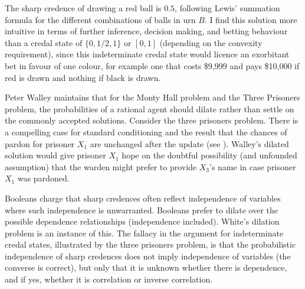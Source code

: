 \documentclass[11pt]{article}
\begin{document}
The sharp credence of drawing a red ball is $0.5$, following Lewis'
summation formula for the different combinations of balls in urn $B$.
I find this solution more intuitive in terms of further inference,
decision making, and betting behaviour than a credal state of
$\{0,1/2,1\}$ or $[0,1]$ (depending on the convexity requirement),
since this indeterminate credal state would licence an exorbitant bet
in favour of one colour, for example one that costs \$9,999 and pays
\$10,000 if red is drawn and nothing if black is drawn.


Peter Walley maintains that for the Monty Hall problem and the Three
Prisoners problem, the probabilities of a rational agent should dilate
rather than settle on the commonly accepted solutions. Consider the
three prisoners problem. There is a compelling case for standard
conditioning and the result that the chances of pardon for prisoner
$X_{1}$ are unchanged after the update (see
). Walley's dilated solution would give
prisoner $X_{1}$ hope on the doubtful possibility (and unfounded
assumption) that the warden might prefer to provide $X_{3}$'s name in
case prisoner $X_{1}$ was pardoned.

Booleans charge that sharp credences often reflect independence of
variables where such independence is unwarranted. Booleans prefer to
dilate over the possible dependence relationships (independence
included). White's dilation problem is an instance of this. The
fallacy in the argument for indeterminate credal states, illustrated
by the three prisoners problem, is that the probabilistic independence
of sharp credences does not imply independence of variables (the
converse is correct), but only that it is unknown whether there is
dependence, and if yes, whether it is correlation or inverse
correlation.

\end{document}
